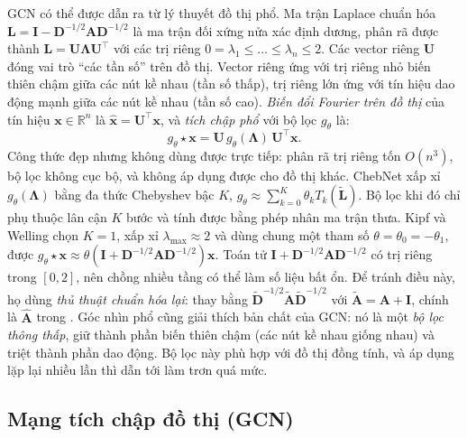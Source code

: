 GCN có thể được dẫn ra từ lý thuyết đồ thị phổ. Ma trận Laplace chuẩn hóa $\mathbf L = \mathbf I - \mathbf D^{-1/2}\mathbf A\mathbf D^{-1/2}$ là ma trận đối xứng nửa xác định dương, phân rã được thành $\mathbf L = \mathbf U\boldsymbol\Lambda\mathbf U^\top$ với các trị riêng $0=\lambda_1\le\ldots\le\lambda_n\le 2$. Các vector riêng $\mathbf U$ đóng vai trò ``các tần số'' trên đồ thị. Vector riêng ứng với trị riêng nhỏ biến thiên chậm giữa các nút kề nhau (tần số thấp), trị riêng lớn ứng với tín hiệu dao động mạnh giữa các nút kề nhau (tần số cao). \emph{Biến đổi Fourier trên đồ thị} của tín hiệu $\mathbf x\in\mathbb R^n$ là $\hat{\mathbf x}=\mathbf U^\top\mathbf x$, và \emph{tích chập phổ} với bộ lọc $g_\theta$ là:
\begin{equation}
g_\theta \star \mathbf x = \mathbf U\, g_\theta(\boldsymbol\Lambda)\,\mathbf U^\top\mathbf x .
\label{eq:spectral}
\end{equation}
Công thức  đẹp nhưng không dùng được trực tiếp: phân rã trị riêng tốn $O(n^3)$, bộ lọc không cục bộ, và không áp dụng được cho đồ thị khác. ChebNet xấp xỉ $g_\theta(\boldsymbol\Lambda)$ bằng đa thức Chebyshev bậc $K$, $g_\theta\approx\sum_{k=0}^{K}\theta_k T_k(\tilde{\mathbf L})$. Bộ lọc khi đó chỉ phụ thuộc lân cận $K$ bước và tính được bằng phép nhân ma trận thưa. Kipf và Welling chọn $K=1$, xấp xỉ $\lambda_{\max}\approx 2$ và dùng chung một tham số $\theta = \theta_0 = -\theta_1$, được $g_\theta\star\mathbf x \approx \theta(\mathbf I + \mathbf D^{-1/2}\mathbf A\mathbf D^{-1/2})\mathbf x$. Toán tử $\mathbf I + \mathbf D^{-1/2}\mathbf A\mathbf D^{-1/2}$ có trị riêng trong $[0,2]$, nên chồng nhiều tầng có thể làm số liệu bất ổn. Để tránh điều này, họ dùng \emph{thủ thuật chuẩn hóa lại}: thay bằng $\tilde{\mathbf D}^{-1/2}\tilde{\mathbf A}\tilde{\mathbf D}^{-1/2}$ với $\tilde{\mathbf A}=\mathbf A+\mathbf I$, chính là $\hat{\mathbf A}$ trong . Góc nhìn phổ cũng giải thích bản chất của GCN: nó là một \emph{bộ lọc thông thấp}, giữ thành phần biến thiên chậm (các nút kề nhau giống nhau) và triệt thành phần dao động. Bộ lọc này phù hợp với đồ thị đồng tính, và áp dụng lặp lại nhiều lần thì dẫn tới làm trơn quá mức.

\subsection{Mạng tích chập đồ thị (GCN)}

